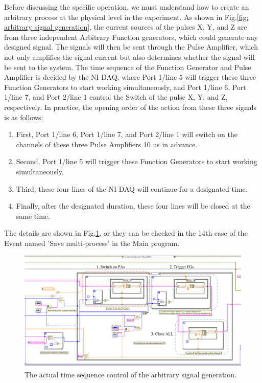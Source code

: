 \documentclass{article}
\begin{document}
Before discussing the specific operation, we must understand how to create an arbitrary process at the physical level in the experiment. As shown in Fig.\ref{fig: arbitrary signal generation}, the current sources of the pulses X, Y, and Z are from three independent Arbitrary Function generators, which could generate any designed signal. The signals will then be sent through the Pulse Amplifier, which not only amplifies the signal current but also determines whether the signal will be sent to the system. The time sequence of the Function Generator and Pulse Amplifier is decided by the NI-DAQ, where Port 1/line 5 will trigger these three Function Generators to start working simultaneously, and Port 1/line 6, Port 1/line 7, and Port 2/line 1 control the Switch of the pulse X, Y, and Z, respectively. In practice, the opening order of the action from these three signals is as follows:
\begin{enumerate}
    \item First, Port 1/line 6, Port 1/line 7, and Port 2/line 1 will switch on the channels of these three Pulse Amplifiers 10 us in advance.
    \item Second, Port 1/line 5 will trigger these Function Generators to start working simultaneously. 
    \item Third, these four lines of the NI DAQ will continue for a designated time.
    \item Finally, after the designated duration, these four lines will be closed at the same time. 
\end{enumerate}
The details are shown in Fig.\ref{fig: arbitrary process creation}, or they can be checked in the 14th case of the Event named 'Save multi-process' in the Main program.  

\begin{figure}[htbp]
    \centering
    \includegraphics[width=0.9\linewidth]{fig/Arbitrary Process.png}
    \caption{The actual time sequence control of the arbitrary signal generation.}
    \label{fig: arbitrary process creation}
\end{figure}
\end{document}
